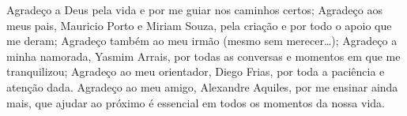Agradeço a Deus pela vida e por me guiar nos caminhos certos; Agradeço aos meus pais, Mauricio Porto e Miriam Souza, pela criação e por todo o apoio que me deram; Agradeço também ao meu irmão (mesmo sem merecer\ldots); Agradeço a minha namorada, Yasmim Arrais, por todas as conversas e momentos em que me tranquilizou; Agradeço ao meu orientador, Diego Frias, por toda a paciência e atenção dada. Agradeço ao meu amigo, Alexandre Aquiles, por me ensinar ainda mais, que ajudar ao próximo é essencial em todos os momentos da nossa vida.